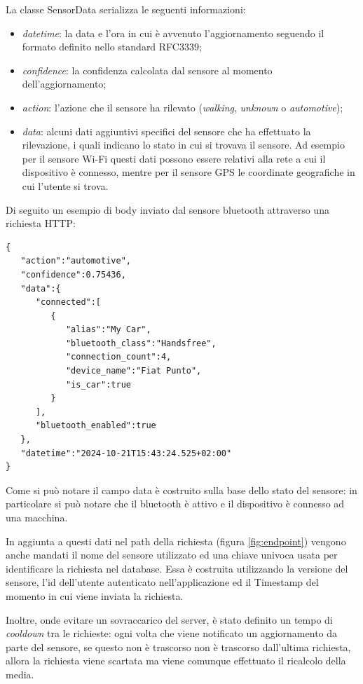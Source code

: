 La classe SensorData serializza le seguenti informazioni:
\begin{itemize}
    \item \textit{datetime}: la data e l'ora in cui è avvenuto l'aggiornamento seguendo il formato definito nello standard RFC3339\cite{ref:RFC3339};
    \item \textit{confidence}: la confidenza calcolata dal sensore al momento dell'aggiornamento;
    \item \textit{action}: l'azione che il sensore ha rilevato (\textit{walking}, \textit{unknown} o \textit{automotive});
    \item \textit{data}: alcuni dati aggiuntivi specifici del sensore che ha effettuato la rilevazione, i quali indicano lo stato in cui si trovava il sensore. Ad esempio per il sensore Wi-Fi questi dati possono essere relativi alla rete a cui il dispositivo è connesso, mentre per il sensore GPS le coordinate geografiche in cui l'utente si trova.
\end{itemize}
Di seguito un esempio di body inviato dal sensore bluetooth attraverso una richiesta HTTP:
\begin{verbatim}
{
   "action":"automotive",
   "confidence":0.75436,
   "data":{
      "connected":[
         {
            "alias":"My Car",
            "bluetooth_class":"Handsfree",
            "connection_count":4,
            "device_name":"Fiat Punto",
            "is_car":true
         }
      ],
      "bluetooth_enabled":true
   },
   "datetime":"2024-10-21T15:43:24.525+02:00"
}
\end{verbatim}
Come si può notare il campo data è costruito sulla base dello stato del sensore: in particolare si può notare che il bluetooth è attivo e il dispositivo è connesso ad una macchina.

In aggiunta a questi dati nel path della richiesta (figura \ref{fig:endpoint}) vengono anche mandati il nome del sensore utilizzato ed una chiave univoca usata per identificare la richiesta nel database. Essa è costruita utilizzando la versione del sensore, l'id dell'utente autenticato nell'applicazione ed il Timestamp del momento in cui viene inviata la richiesta.

Inoltre, onde evitare un sovraccarico del server, è stato definito un tempo di \textit{cooldown} tra le richieste: ogni volta che viene notificato un aggiornamento da parte del sensore, se questo non è trascorso non è trascorso dall'ultima richiesta, allora la richiesta viene scartata ma viene comunque effettuato il ricalcolo della media.


